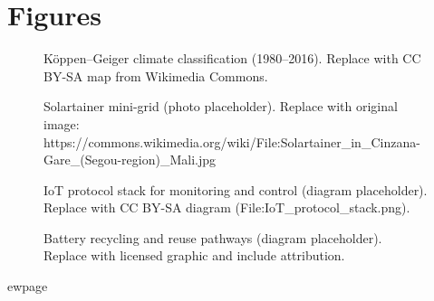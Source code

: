 \documentclass[12pt, a4paper]{article}
\begin{document}
\section*{Figures}

\begin{figure}[H]
\centering
{}
\caption{K\"oppen--Geiger climate classification (1980--2016). Replace with CC BY-SA map from Wikimedia Commons.}
\label{fig:koppen}
\end{figure}

\begin{figure}[H]
\centering
{}
\caption{Solartainer mini-grid (photo placeholder). Replace with original image: https://commons.wikimedia.org/wiki/File:Solartainer\_in\_Cinzana-Gare\_(Segou-region)\_Mali.jpg}
\label{fig:solartainer}
\end{figure}

\begin{figure}[H]
\centering
{}
\caption{IoT protocol stack for monitoring and control (diagram placeholder). Replace with CC BY-SA diagram (File:IoT\_protocol\_stack.png).}
\label{fig:iotstack}
\end{figure}

\begin{figure}[H]
\centering
{}
\caption{Battery recycling and reuse pathways (diagram placeholder). Replace with licensed graphic and include attribution.}
\label{fig:battery_recycling}
\end{figure}


ewpage
\end{document}
